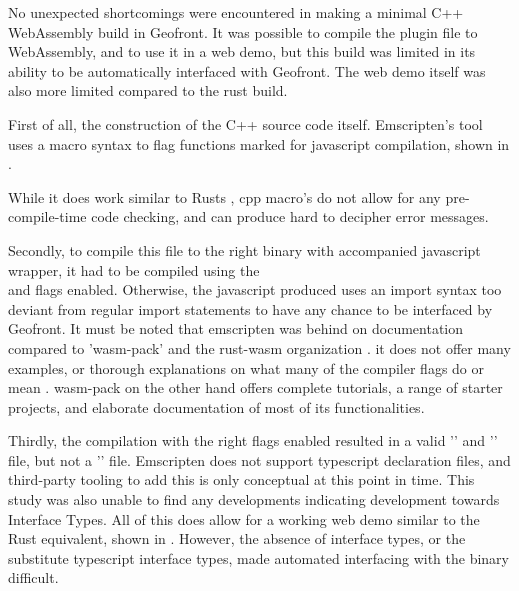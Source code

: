 
No unexpected shortcomings were encountered in making a minimal C++ WebAssembly build in Geofront.
It was possible to compile the plugin file to WebAssembly, and to use it in a web demo, but this build was limited in its ability to be automatically interfaced with Geofront.
The web demo itself was also more limited compared to the rust build.

First of all, the construction of the C++ source code itself.
Emscripten's  tool uses a macro syntax to flag functions marked for javascript compilation, shown in . 

While it does work similar to Rusts , cpp macro's do not allow for any pre-compile-time code checking, and can produce hard to decipher error messages. 

Secondly, to compile this file to the right binary with accompanied javascript wrapper, it had to be compiled using the \\  and  flags enabled.
Otherwise, the javascript produced uses an import syntax too deviant from regular import statements to have any chance to be interfaced by Geofront. 
It must be noted that emscripten was behind on documentation compared to 'wasm-pack' and the rust-wasm organization \citep{contributors_wasm-pack_2022}. 
it does not offer many examples, or thorough explanations on what many of the compiler flags do or mean \citep{emscripten_organization_emscripten_2022}.
wasm-pack on the other hand offers complete tutorials, a range of starter projects, and elaborate documentation of most of its functionalities. 

Thirdly, the compilation with the right flags enabled resulted in a valid '' and '' file, but not a '' file.
Emscripten does not support typescript declaration files, and third-party tooling to add this is only conceptual at this point in time. 
This study was also unable to find any developments indicating development towards Interface Types.
All of this does allow for a working web demo similar to the Rust equivalent, shown in . However, the absence of interface types, or the substitute typescript interface types, made automated interfacing with the binary difficult. 

